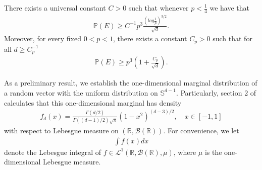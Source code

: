 \documentclass{article}
\newenvironment{manuallemma}[1]{%
  \renewcommand\themanuallemmainner{#1}%
  \manuallemmainner
}{\endmanualtheoreminner}
\begin{document}
\begin{manuallemma}{1} \label{lm:1}
    There exists a universal constant $C > 0$ such that whenever $p < \frac{1}{4}$ we have that
    \begin{align}
    \mathbb{P}(E) \geq C^{-1}p^3 \frac{(log\frac{1}{p})^{3/2}}{\sqrt{d}}.\label{eq1}
    \end{align}
    Moreover, for every fixed $0 < p <1$, there exists a constant $C_p > 0$ such that for all $d \geq C_p^{-1}$
    \begin{align}
    \mathbb{P}(E) \geq p^3 \left(1 + \frac{C_p}{\sqrt{d}} \right).\label{eq2}
    \end{align}
\end{manuallemma}

As a preliminary result, we establish the one-dimensional marginal distribution of a random vector with the uniform distribution on $\mathbb{S}^{d-1}$. Particularly, section 2 of \cite{sodin2005tail} calculates that this one-dimensional marginal has density
\begin{align*}
    f_d(x) = \frac{\Gamma(d/2)}{\Gamma((d-1)/2)\sqrt{\pi}}(1 - x^2)^{(d-3)/2}, \quad x \in [-1, 1]
\end{align*}
with respect to Lebesgue measure on $(\mathbb{R}, \mathcal{B}(\mathbb{R}))$. For convenience, we let 
\begin{align*}
    \int f(x) dx
\end{align*}
denote the Lebesgue integral of $f \in \mathcal{L}^1(\mathbb{R}, \mathcal{B}(\mathbb{R}), \mu)$, where $\mu$ is the one-dimensional Lebesgue measure. 
\end{document}
